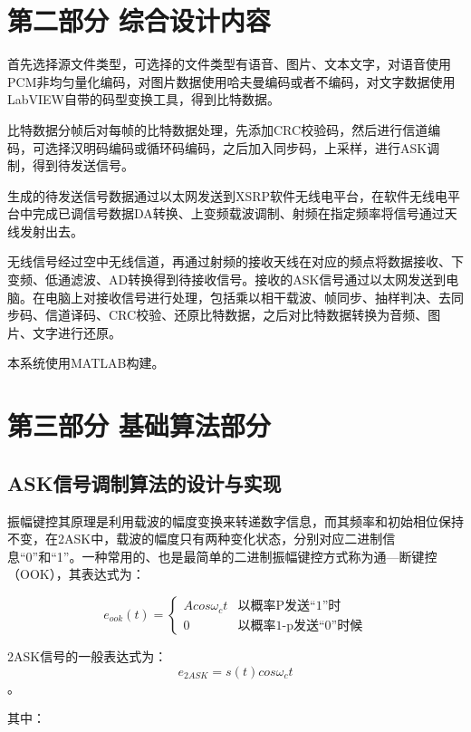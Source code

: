 \documentclass[UTF8]{ctexart}
\begin{document}
\section{第二部分 \texorpdfstring{\quad}{} 综合设计内容}

首先选择源文件类型，可选择的文件类型有语音、图片、文本文字，对语音使用PCM非均匀量化编码，对图片数据使用哈夫曼编码或者不编码，对文字数据使用LabVIEW自带的码型变换工具，得到比特数据。

比特数据分帧后对每帧的比特数据处理，先添加CRC校验码，然后进行信道编码，可选择汉明码编码或循环码编码，之后加入同步码，上采样，进行ASK调制，得到待发送信号。

生成的待发送信号数据通过以太网发送到XSRP软件无线电平台，在软件无线电平台中完成已调信号数据DA转换、上变频载波调制、射频在指定频率将信号通过天线发射出去。

无线信号经过空中无线信道，再通过射频的接收天线在对应的频点将数据接收、下变频、低通滤波、AD转换得到待接收信号。接收的ASK信号通过以太网发送到电脑。在电脑上对接收信号进行处理，包括乘以相干载波、帧同步、抽样判决、去同步码、信道译码、CRC校验、还原比特数据，之后对比特数据转换为音频、图片、文字进行还原。

本系统使用MATLAB构建。

\section{第三部分 \texorpdfstring{\quad}{} 基础算法部分}

\subsection{ASK信号调制算法的设计与实现}
\label{para.3.1}

振幅键控其原理是利用载波的幅度变换来转递数字信息，而其频率和初始相位保持不变，在2ASK中，载波的幅度只有两种变化状态，分别对应二进制信息“0”和“1”。一种常用的、也是最简单的二进制振幅键控方式称为通—断键控（OOK），其表达式为：

\begin{equation*}
    e_{ook}(t)=\begin{cases}
                Acos\omega_c t& \text{以概率P发送“1”时}\\
                0& \text{以概率1-p发送“0”时候}
                \end{cases}
\end{equation*}

2ASK信号的一般表达式为：
$$e_{2ASK}=s(t)cos\omega_ct$$。

其中：
\end{document}
